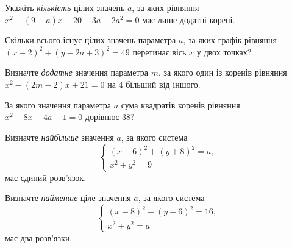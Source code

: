 \documentclass[12pt]{article}
\begin{document}
\begin{samepage}
\noindent\zadnum Укажіть \textit{кількість} цілих значень $a$, за яких рівняння $x^2 - (9 - a)x + 20 - 3a - 2a^2 = 0$ має лише додатні корені. 

\nmtnobreak
\nopagebreak\nbvspace{0.3cm}
\nmtAnswerBox
\par{}
\end{samepage}

\begin{samepage}
\noindent\zadnum Скільки всього існує цілих значень параметра $a$, за яких графік рівняння $(x - 2)^2 + (y - 2a + 3)^2 = 49$ перетинає вісь $x$ у двох точках? 

\nmtnobreak
\nopagebreak\nbvspace{0.3cm}
\nmtAnswerBox
\par{}
\end{samepage}

\begin{samepage}
\noindent\zadnum Визначте \textit{додатне} значення параметра $m$, за якого один із коренів рівняння $x^2 - (2m - 2)x + 21 = 0$ на 4 більший від іншого. 

\nmtnobreak
\nopagebreak\nbvspace{0.3cm}
\nmtAnswerBox
\par{}
\end{samepage}

\begin{samepage}
\noindent\zadnum За якого значення параметра $a$ сума квадратів коренів рівняння $x^2 - 8x + 4a - 1 = 0$ дорівнює 38? 

\nmtnobreak
\nopagebreak\nbvspace{0.3cm}
\nmtAnswerBox
\par{}
\end{samepage}

\begin{samepage}
\noindent\zadnum Визначте \textit{найбільше} значення $a$, за якого система
$$
\begin{cases}
(x - 6)^2 + (y + 8)^2 = a, \\
x^2 + y^2 = 9
\end{cases}
$$
має єдиний розв'язок. 

\nmtnobreak
\nopagebreak\nbvspace{0.3cm}
\nmtAnswerBox
\par{}
\end{samepage}

\begin{samepage}
\noindent\zadnum Визначте \textit{найменше} ціле значення $a$, за якого система
$$
\begin{cases}
(x - 8)^2 + (y - 6)^2 = 16, \\
x^2 + y^2 = a
\end{cases}
$$
має два розв'язки. 

\nmtnobreak
\nopagebreak\nbvspace{0.3cm}
\nmtAnswerBox
\par{}
\end{samepage}
\end{document}
